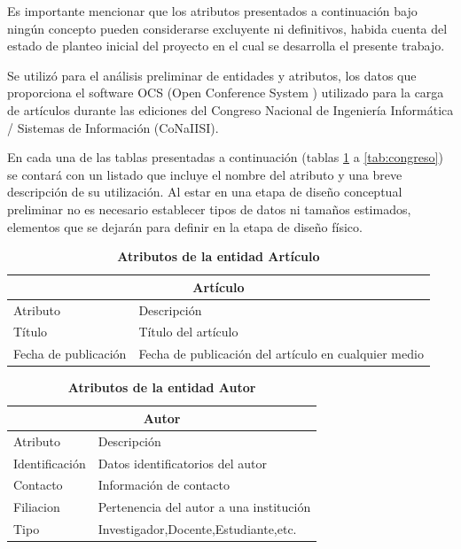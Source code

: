 Es importante mencionar que los atributos presentados a continuación bajo ningún concepto pueden considerarse excluyente ni definitivos, habida cuenta del estado de planteo inicial del proyecto en el cual se desarrolla el presente trabajo.

Se utilizó para el análisis preliminar de entidades y atributos, los datos que proporciona el software OCS (Open Conference System \cite{openconf2020}) utilizado para la carga de artículos durante las ediciones del Congreso Nacional de Ingeniería Informática / Sistemas de Información (CoNaIISI).

En cada una de las tablas presentadas a continuación (tablas \ref{tab:articulo} a \ref{tab:congreso}) se contará con un listado que incluye el nombre del atributo y una breve descripción de su utilización. Al estar en una etapa de diseño conceptual preliminar no es necesario establecer tipos de datos ni tamaños estimados, elementos que se dejarán para definir en la etapa de diseño físico.

\begin{table}[!h]
	\centering	
	\caption{\textbf{Atributos de la entidad Artículo}}
	\begin{tabularx}{0.9\linewidth}{lX}
		\toprule
		\multicolumn{2}{c}{\textbf{Artículo}}\\
		\midrule
		Atributo&Descripción\\
		\midrule
		Título&Título del artículo\\
		Fecha de publicación&Fecha de publicación del artículo en cualquier medio\\
		
		\bottomrule
	\end{tabularx}
	
	\label{tab:articulo}
\end{table}%

\begin{table}[!h]
	\centering	
	\caption{\textbf{Atributos de la entidad Autor}}
	\begin{tabularx}{0.9\linewidth}{lX}
		\toprule
		\multicolumn{2}{c}{\textbf{Autor}}\\
		\midrule
		Atributo&Descripción\\
		\midrule
		Identificación&Datos identificatorios del autor\\
		Contacto&Información de contacto\\
		Filiacion&Pertenencia del autor a una institución\\
		Tipo&Investigador,Docente,Estudiante,etc.\\
		\bottomrule
	\end{tabularx}
	
	\label{tab:autor}
\end{table}%

